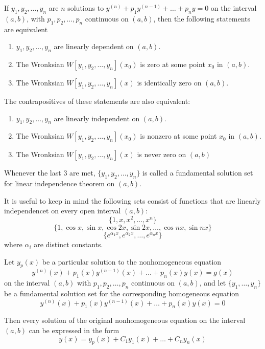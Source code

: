 \documentclass[../diffeq.tex]{subfiles}
\begin{document}
\begin{theorem}
    If $y_1,y_2,\dots,y_n$ are $n$ solutions to $y^{(n)}+p_1y^{(n-1)}+\dots + p_n y =0$ on the interval $(a,b)$, with $p_1,p_2,\dots,p_n$ continuous on $(a,b)$, then the following statements are equivalent 
    \begin{enumerate}
        \item $y_1,y_2,\dots,y_n$ are linearly dependent on $(a,b)$.
        \item The Wronksian $W[y_1,y_2,\dots,y_n](x_0)$ is zero at some point $x_0$ in $(a,b)$.
        \item The Wronksian $W[y_1,y_2,\dots,y_n](x)$ is identically zero on $(a,b)$.
    \end{enumerate}

    The contrapositives of these statements are also equivalent:
    \begin{enumerate}
        \item $y_1,y_2,\dots,y_n$ are linearly independent on $(a,b)$.
        \item The Wronksian $W[y_1,y_2,\dots,y_n](x_0)$ is nonzero at some point $x_0$ in $(a,b)$.
        \item The Wronksian $W[y_1,y_2,\dots,y_n](x)$ is never zero on $(a,b)$
    \end{enumerate}

    Whenever the last 3 are met, $\{y_1,y_2,\dots,y_n\}$ is called a fundamental solution set for linear independence theorem on $(a,b)$.
\end{theorem}

It is useful to keep in mind the following sets consist of functions that are linearly independencet on every open interval $(a,b)$:
\[ \{1,x,x^2,\dots,x^n\} \]
\[ \{1,\cos x,\sin x,\cos 2x, \sin 2x,\dots, \cos nx, \sin nx \} \]
\[\{ e^{\alpha_1 x}, e^{\alpha_2 x},\dots, e^{\alpha_n x} \}\]
where $\alpha_i$ are distinct constants.

\begin{theorem}
    Let $y_p(x)$ be a particular solution to the nonhomogeneous equation 
    \[ y^{(n)}(x)+p_1(x)y^{(n-1)}(x)+\dots + p_n(x)y(x) = g(x) \]
    on the interval $(a,b)$ with $p_1,p_2,\dots,p_n$ continuous on $(a,b)$, and let $\{y_1,\dots,y_n\}$ be a fundamental solution set for the corresponding homogeneous equation 
    \[ y^{(n)}(x)+p_1(x)y^{(n-1)}(x)+\dots + p_n(x)y(x)=0 \]

    Then every solution of the original nonhomogeneous equation on the interval $(a,b)$ can be expressed in the form 
    \[ y(x) = y_p(x)+C_1y_1(x)+\dots + C_ny_n(x) \]
\end{theorem}
\end{document}

